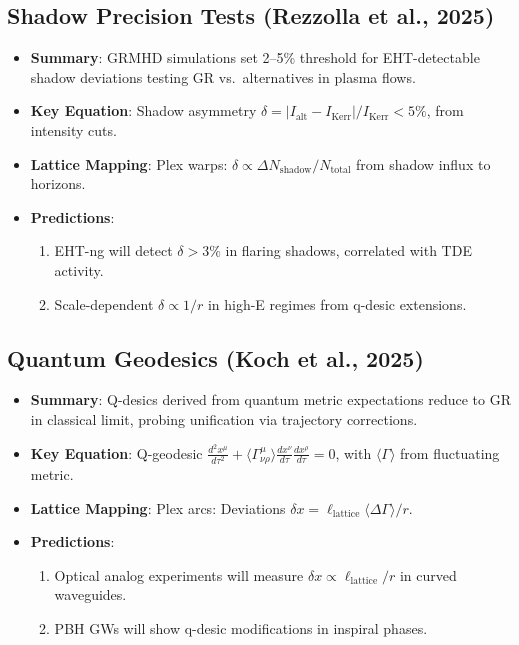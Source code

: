 \documentclass[11pt,a4paper]{article}
\begin{document}
\subsection{Shadow Precision Tests (Rezzolla et al., 2025)}

\begin{itemize}
\item \textbf{Summary}: GRMHD simulations set 2--5\% threshold for EHT-detectable shadow deviations testing GR vs.\ alternatives in plasma flows.

\item \textbf{Key Equation}: Shadow asymmetry $\delta = |I_{\mathrm{alt}} - I_{\mathrm{Kerr}}| / I_{\mathrm{Kerr}} < 5\%$, from intensity cuts.

\item \textbf{Lattice Mapping}: Plex warps: $\delta \propto \Delta N_{\mathrm{shadow}}/N_{\mathrm{total}}$ from shadow influx to horizons.

\item \textbf{Predictions}:
\begin{enumerate}
\item EHT-ng will detect $\delta >3\%$ in flaring shadows, correlated with TDE activity.
\item Scale-dependent $\delta \propto 1/r$ in high-E regimes from q-desic extensions.
\end{enumerate}
\end{itemize}

\subsection{Quantum Geodesics (Koch et al., 2025)}

\begin{itemize}
\item \textbf{Summary}: Q-desics derived from quantum metric expectations reduce to GR in classical limit, probing unification via trajectory corrections.

\item \textbf{Key Equation}: Q-geodesic $\frac{d^2 x^\mu}{d\tau^2} + \langle \Gamma^\mu_{\nu\rho} \rangle \frac{dx^\nu}{d\tau} \frac{dx^\rho}{d\tau} = 0$, with $\langle \Gamma \rangle$ from fluctuating metric.

\item \textbf{Lattice Mapping}: Plex arcs: Deviations $\delta x = \ell_{\mathrm{lattice}} \langle \Delta \Gamma \rangle / r$.

\item \textbf{Predictions}:
\begin{enumerate}
\item Optical analog experiments will measure $\delta x \propto \ell_{\mathrm{lattice}}/r$ in curved waveguides.
\item PBH GWs will show q-desic modifications in inspiral phases.
\end{enumerate}
\end{itemize}
\end{document}

